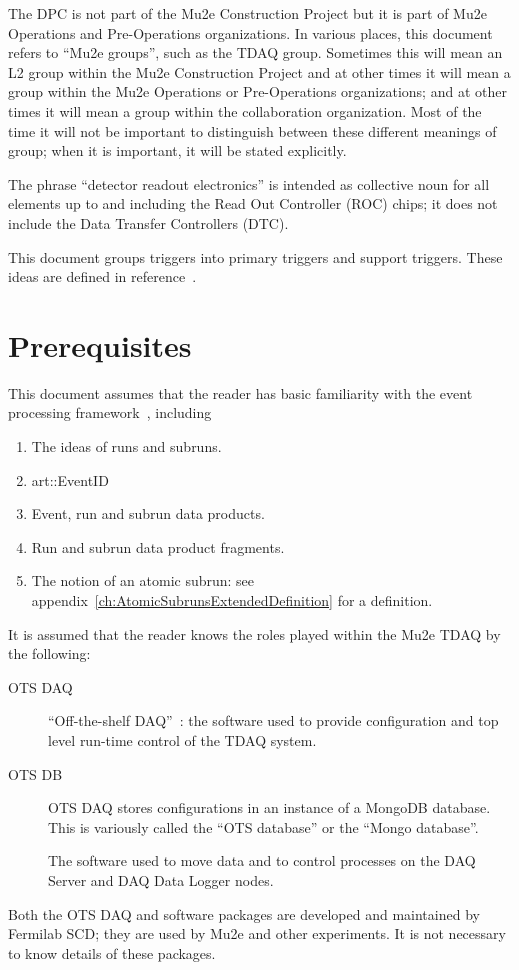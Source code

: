 The DPC is not part of the Mu2e Construction Project but it is part of Mu2e Operations
and Pre-Operations organizations.
In various places, this document refers to ``Mu2e groups'', such as the TDAQ group.
Sometimes this will mean an L2 group within the Mu2e Construction Project and at other
times it will mean a group within the Mu2e Operations or Pre-Operations organizations;
and at other times it will mean a group within the collaboration organization.
Most of the time it will not be important to distinguish between these different meanings
of group; when it is important, it will be stated explicitly.

The phrase ``detector readout electronics'' is intended as collective noun for all elements
up to and including the Read Out Controller (ROC) chips; it does not include
the Data Transfer Controllers (DTC).

This document groups triggers into primary triggers and support triggers.
These ideas are defined in reference~\cite{TriggerSU2020}.



\section{Prerequisites}

This document assumes that the reader has basic familiarity with the \art event processing framework~\cite{ARTWORDPRESS}, including

\begin{enumerate}
\item The ideas of runs and subruns.
\item {\code art::EventID}
\item Event, run and subrun  data products.
\item Run and subrun data product fragments.
\item The notion of an atomic subrun: see appendix~\ref{ch:AtomicSubrunsExtendedDefinition} for a definition.
\end{enumerate}

It is assumed that the reader knows the roles played within the Mu2e TDAQ by the following:
\begin{description}
\item[OTS DAQ] ``Off-the-shelf DAQ''~\cite{MU2EOTSDAQ}: the software used to provide configuration and top level run-time control of the TDAQ system.
\item[OTS DB] OTS DAQ stores configurations in an instance of a MongoDB database.  This is variously called the ``OTS database'' or the ``Mongo database''.
\item[\artdaq] The software used to move data and to control processes on the DAQ Server and DAQ Data Logger nodes.
\end{description}
Both the OTS DAQ and \artdaq software packages are developed and maintained by Fermilab SCD;
they are used by Mu2e and other experiments. It is not necessary to know details of these packages.

